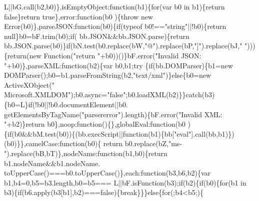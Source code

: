 \begin{DoxyCode}
      L||bG.call(b2,b0)\},isEmptyObject:\textcolor{keyword}{function}(b1)\{\textcolor{keywordflow}{for}(var b0 in b1)\{\textcolor{keywordflow}{return} \textcolor{keyword}{false}\}\textcolor{keywordflow}{return} \textcolor{keyword}{true}\},error:\textcolor{keyword}{function}(b0
      )\{\textcolor{keywordflow}{throw} \textcolor{keyword}{new} Error(b0)\},parseJSON:\textcolor{keyword}{function}(b0)\{\textcolor{keywordflow}{if}(typeof b0!==\textcolor{stringliteral}{"string"}||!b0)\{\textcolor{keywordflow}{return} null\}b0=bF.trim(b0);\textcolor{keywordflow}{if}(
      bb.JSON&&bb.JSON.parse)\{\textcolor{keywordflow}{return} bb.JSON.parse(b0)\}\textcolor{keywordflow}{if}(bN.test(b0.replace(bW,\textcolor{stringliteral}{"@"}).replace(bP,\textcolor{stringliteral}{"]"}).replace(bJ,\textcolor{stringliteral}{"
      "})))\{\textcolor{keywordflow}{return}(\textcolor{keyword}{new} Function(\textcolor{stringliteral}{"return "}+b0))()\}bF.error(\textcolor{stringliteral}{"Invalid JSON: "}+b0)\},parseXML:\textcolor{keyword}{function}(b2)\{var b0,b1;\textcolor{keywordflow}{try}
      \{\textcolor{keywordflow}{if}(bb.DOMParser)\{b1=\textcolor{keyword}{new} DOMParser();b0=b1.parseFromString(b2,\textcolor{stringliteral}{"text/xml"})\}\textcolor{keywordflow}{else}\{b0=\textcolor{keyword}{new} ActiveXObject(\textcolor{stringliteral}{"
      Microsoft.XMLDOM"});b0.async=\textcolor{stringliteral}{"false"};b0.loadXML(b2)\}\}\textcolor{keywordflow}{catch}(b3)\{b0=L\}\textcolor{keywordflow}{if}(!b0||!b0.documentElement||b0.
      getElementsByTagName(\textcolor{stringliteral}{"parsererror"}).length)\{bF.error(\textcolor{stringliteral}{"Invalid XML: "}+b2)\}\textcolor{keywordflow}{return} b0\},noop:\textcolor{keyword}{function}()\{\},globalEval:\textcolor{keyword}{function}(b0
      )\{\textcolor{keywordflow}{if}(b0&&bM.test(b0))\{(bb.execScript||\textcolor{keyword}{function}(b1)\{bb[\textcolor{stringliteral}{"eval"}].call(bb,b1)\})(b0)\}\},camelCase:\textcolor{keyword}{function}(b0)\{\textcolor{keywordflow}{
      return} b0.replace(bZ,\textcolor{stringliteral}{"ms-"}).replace(bB,bT)\},nodeName:\textcolor{keyword}{function}(b1,b0)\{\textcolor{keywordflow}{return} b1.nodeName&&b1.nodeName.
      toUpperCase()===b0.toUpperCase()\},each:\textcolor{keyword}{function}(b3,b6,b2)\{var b1,b4=0,b5=b3.length,b0=b5===
      L||bF.isFunction(b3);\textcolor{keywordflow}{if}(b2)\{\textcolor{keywordflow}{if}(b0)\{\textcolor{keywordflow}{for}(b1 in b3)\{\textcolor{keywordflow}{if}(b6.apply(b3[b1],b2)===\textcolor{keyword}{false})\{\textcolor{keywordflow}{break}\}\}\}\textcolor{keywordflow}{else}\{\textcolor{keywordflow}{for}(;b4<b5;)\{\textcolor{keywordflow}{
}
\end{DoxyCode}

